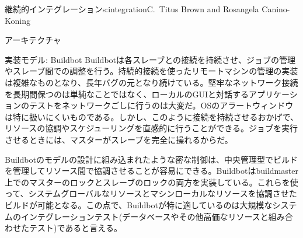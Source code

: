 \begin{aosachapter}{継続的インテグレーション}{s:integration}{C.\ Titus Brown and Rosangela Canino-Koning}
\begin{aosasect1}{アーキテクチャ}
\begin{aosasect2}{実装モデル: Buildbot}
Buildbotは各スレーブとの接続を持続させ、ジョブの管理やスレーブ間での調整を行う。持続的接続を使ったリモートマシンの管理の実装は複雑なものとなり、長年バグの元となり続けている。堅牢なネットワーク接続を長期間保つのは単純なことではなく、ローカルのGUIと対話するアプリケーションのテストをネットワークごしに行うのは大変だ。OSのアラートウィンドウは特に扱いにくいものである。しかし、このように接続を持続させるおかげで、リソースの協調やスケジューリングを直感的に行うことができる。ジョブを実行させるときには、マスターがスレーブを完全に操れるからだ。

Buildbotのモデルの設計に組み込まれたような密な制御は、中央管理型でビルドを管理してリソース間で協調させることが容易にできる。Buildbotはbuildmaster上でのマスターのロックとスレーブのロックの両方を実装している。これらを使って、システムグローバルなリソースとマシンローカルなリソースを協調させたビルドが可能となる。この点で、Buildbotが特に適しているのは大規模なシステムのインテグレーションテスト(データベースやその他高価なリソースと組み合わせたテスト)であると言える。


\end{aosasect2}
\end{aosasect1}
\end{aosachapter}
